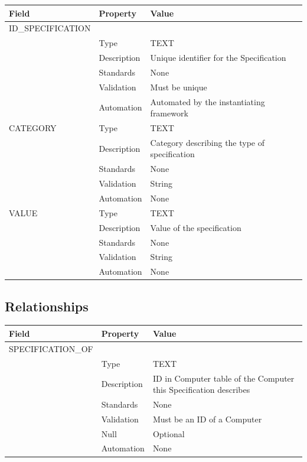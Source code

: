 \begin{longtable}[]{@{}lll@{}}
\toprule\noalign{}
Field & Property & Value \\
\midrule\noalign{}
\endhead
\bottomrule\noalign{}
\endlastfoot
ID\_SPECIFICATION & & \\
& Type & TEXT \\
& Description & Unique identifier for the Specification \\
& Standards & None \\
& Validation & Must be unique \\
& Automation & Automated by the instantiating framework \\
CATEGORY & Type & TEXT \\
& Description & Category describing the type of specification \\
& Standards & None \\
& Validation & String \\
& Automation & None \\
VALUE & Type & TEXT \\
& Description & Value of the specification \\
& Standards & None \\
& Validation & String \\
& Automation & None \\
\end{longtable}

\subsection{Relationships}\label{relationships-24}

\begin{longtable}[]{@{}
  >{\raggedright\arraybackslash}p{}
  >{\raggedright\arraybackslash}p{}
  >{\raggedright\arraybackslash}p{}@{}}
\toprule\noalign{}
\begin{minipage}[b]{\linewidth}\raggedright
Field
\end{minipage} & \begin{minipage}[b]{\linewidth}\raggedright
Property
\end{minipage} & \begin{minipage}[b]{\linewidth}\raggedright
Value
\end{minipage} \\
\midrule\noalign{}
\endhead
\bottomrule\noalign{}
\endlastfoot
SPECIFICATION\_OF & & \\
& Type & TEXT \\
& Description & ID in Computer table of the Computer this Specification
describes \\
& Standards & None \\
& Validation & Must be an ID of a Computer \\
& Null & Optional \\
& Automation & None \\
\end{longtable}

